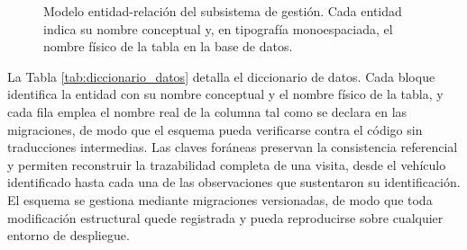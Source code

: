 \begin{figure}[H]
    \caption{Modelo entidad-relación del subsistema de gestión. Cada entidad
    indica su nombre conceptual y, en tipografía monoespaciada, el nombre físico
    de la tabla en la base de datos.}
    \label{fig:modelo_er}
\end{figure}

La Tabla \ref{tab:diccionario_datos} detalla el diccionario de datos. Cada bloque
identifica la entidad con su nombre conceptual y el nombre físico de la tabla, y
cada fila emplea el nombre real de la columna tal como se declara en las
migraciones, de modo que el esquema pueda verificarse contra el código sin
traducciones intermedias. Las claves foráneas preservan la consistencia
referencial y permiten reconstruir la trazabilidad completa de una visita, desde
el vehículo identificado hasta cada una de las observaciones que sustentaron su
identificación. El esquema se gestiona mediante migraciones versionadas, de modo
que toda modificación estructural quede registrada y pueda reproducirse sobre
cualquier entorno de despliegue.

